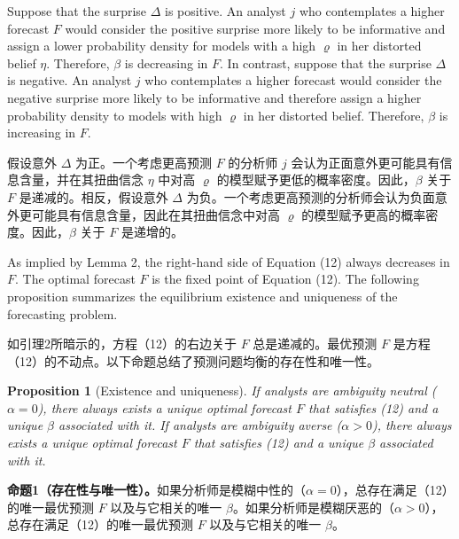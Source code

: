 \documentclass[12pt,a4paper]{article}
\newenvironment{original}
  {\par\medskip\noindent\ignorespaces}
  {\par\medskip}
\newenvironment{translation}
  {\par\noindent{\color{transblue}\ignorespaces}}
  {\par\bigskip}
\newtheorem{proposition}[theorem]{Proposition}
\begin{document}
\begin{original}
Suppose that the surprise $\Delta$ is positive. An analyst $j$ who contemplates a higher forecast $F$ would consider the positive surprise more likely to be informative and assign a lower probability density for models with a high $\varrho$ in her distorted belief $\eta$. Therefore, $\beta$ is decreasing in $F$. In contrast, suppose that the surprise $\Delta$ is negative. An analyst $j$ who contemplates a higher forecast would consider the negative surprise more likely to be informative and therefore assign a higher probability density to models with high $\varrho$ in her distorted belief. Therefore, $\beta$ is increasing in $F$.
\end{original}
\begin{translation}
假设意外 $\Delta$ 为正。一个考虑更高预测 $F$ 的分析师 $j$ 会认为正面意外更可能具有信息含量，并在其扭曲信念 $\eta$ 中对高 $\varrho$ 的模型赋予更低的概率密度。因此，$\beta$ 关于 $F$ 是递减的。相反，假设意外 $\Delta$ 为负。一个考虑更高预测的分析师会认为负面意外更可能具有信息含量，因此在其扭曲信念中对高 $\varrho$ 的模型赋予更高的概率密度。因此，$\beta$ 关于 $F$ 是递增的。
\end{translation}

\begin{original}
As implied by Lemma 2, the right-hand side of Equation (12) always decreases in $F$. The optimal forecast $F$ is the fixed point of Equation (12). The following proposition summarizes the equilibrium existence and uniqueness of the forecasting problem.
\end{original}
\begin{translation}
如引理2所暗示的，方程（12）的右边关于 $F$ 总是递减的。最优预测 $F$ 是方程（12）的不动点。以下命题总结了预测问题均衡的存在性和唯一性。
\end{translation}

\begin{proposition}[Existence and uniqueness]
If analysts are ambiguity neutral ($\alpha = 0$), there always exists a unique optimal forecast $F$ that satisfies (12) and a unique $\beta$ associated with it. If analysts are ambiguity averse ($\alpha > 0$), there always exists a unique optimal forecast $F$ that satisfies (12) and a unique $\beta$ associated with it.
\end{proposition}
\begin{translation}
\textbf{命题1（存在性与唯一性）。}如果分析师是模糊中性的（$\alpha = 0$），总存在满足（12）的唯一最优预测 $F$ 以及与它相关的唯一 $\beta$。如果分析师是模糊厌恶的（$\alpha > 0$），总存在满足（12）的唯一最优预测 $F$ 以及与它相关的唯一 $\beta$。
\end{translation}
\end{document}
